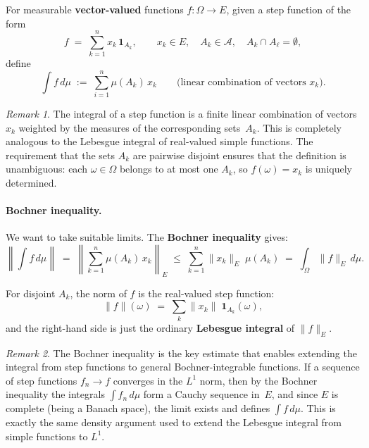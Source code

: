 \documentclass[11pt]{article}
\theoremstyle{definition}
\theoremstyle{remark}
\newtheorem{remark}{Remark}
\begin{document}
For measurable \textbf{vector-valued} functions $f \colon \Omega \to E$,
given a step function of the form
\[
    f \;=\; \sum_{k=1}^{n} x_k\,\mathbf{1}_{A_k},
    \qquad x_k \in E,\quad A_k \in \mathcal{A},\quad
    A_k \cap A_\ell = \emptyset, \tag{$*$}
\]
define
\[
    \int f\,d\mu
    \;:=\;
    \sum_{i=1}^{n} \mu(A_k)\,x_k
    \qquad \text{(linear combination of vectors $x_k$)}.
\]

\begin{remark}
The integral of a step function is a finite linear combination of vectors $x_k$ weighted by the measures of the corresponding sets~$A_k$.  This is completely analogous to the Lebesgue integral of real-valued simple functions.  The requirement that the sets $A_k$ are pairwise disjoint ensures that the definition is unambiguous: each $\omega \in \Omega$ belongs to at most one $A_k$, so $f(\omega) = x_k$ is uniquely determined.
\end{remark}

\paragraph{Bochner inequality.}

We want to take suitable limits. The \textbf{Bochner inequality} gives:
\[
    \left\|\int f\,d\mu\right\|
    \;=\;
    \left\|\sum_{k=1}^{n} \mu(A_k)\,x_k\right\|_E
    \;\le\;
    \sum_{k=1}^{n} \|x_k\|_E\;\mu(A_k)
    \;=\;
    \int_\Omega \|f\|_E\,d\mu.
\]

For disjoint $A_k$, the norm of $f$ is the real-valued step function:
\[
    \|f\|(\omega)
    \;=\;
    \sum_{k} \|x_k\|\;\mathbf{1}_{A_k}(\omega),
\]
and the right-hand side is just the ordinary \textbf{Lebesgue integral}
of $\|f\|_E$.

\begin{remark}
The Bochner inequality is the key estimate that enables extending the integral from step functions to general Bochner-integrable functions.  If a sequence of step functions $f_n \to f$ converges in the $L^1$ norm, then by the Bochner inequality the integrals $\int f_n\,d\mu$ form a Cauchy sequence in~$E$, and since $E$ is complete (being a Banach space), the limit exists and defines $\int f\,d\mu$.  This is exactly the same density argument used to extend the Lebesgue integral from simple functions to $L^1$.
\end{remark}
\end{document}

